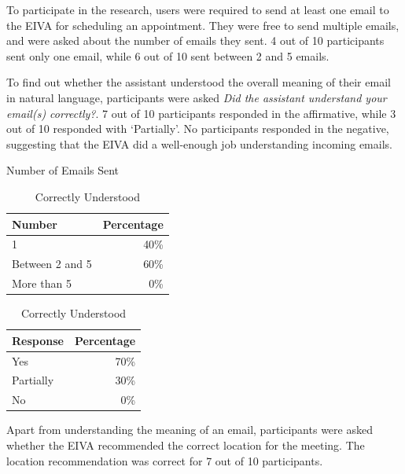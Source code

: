\documentclass{article}
\begin{document}
To participate in the research, users were required to send at least one email to the EIVA for scheduling an appointment. They were free to send multiple emails, and were asked about the number of emails they sent. 4 out of 10 participants sent only one email, while 6 out of 10 sent between 2 and 5 emails.

To find out whether the assistant understood the overall meaning of their email in natural language, participants were asked \emph{Did the assistant understand your email(s) correctly?}. 7 out of 10 participants responded in the affirmative, while 3 out of 10 responded with `Partially'. No participants responded in the negative, suggesting that the EIVA did a well-enough job understanding incoming emails.

\begin{table}[!htb]
    \begin{minipage}{.5\linewidth}
   	 \caption{Number of Emails Sent}
      \centering
        \begin{tabular}{lr}
	        \hline
            \textbf{Number} & \textbf{Percentage} \\
            \hline
            1 & 40\% \\
            Between 2 and 5 & 60\% \\
            More than 5 & 0\% \\
            \hline
        \end{tabular}
    \end{minipage}%
    \hspace{.1cm}
    \begin{minipage}{.5\linewidth}
      \centering
	    \caption{Correctly Understood}
        \begin{tabular}{lr}
	        \hline
            \textbf{Response} & \textbf{Percentage} \\
            \hline
            Yes & 70\% \\
            Partially & 30\% \\
            No & 0\% \\
            \hline
        \end{tabular}
    \end{minipage} 
\end{table}

Apart from understanding the meaning of an email, participants were asked whether the EIVA recommended the correct location for the meeting. The location recommendation was correct for 7 out of 10 participants.
\end{document}
